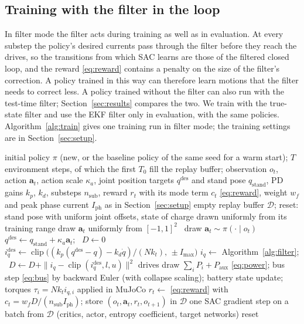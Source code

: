\subsection{Training with the filter in the loop}
In filter mode the filter acts during training as well as in evaluation. At every substep the policy's desired currents pass through the filter before they reach the drives, so the transitions from which SAC learns are those of the filtered closed loop, and the reward \eqref{eq:reward} contains a penalty on the size of the filter's correction. A policy trained in this way can therefore learn motions that the filter needs to correct less. A policy trained without the filter can also run with the test-time filter; Section~\ref{sec:results} compares the two. We train with the true-state filter and use the EKF filter only in evaluation, with the same policies. Algorithm~\ref{alg:train} gives one training run in filter mode; the training settings are in Section~\ref{sec:setup}.
\begin{algorithm}[tbp]
\caption{SAC training with the filter in the loop (filter mode)}\label{alg:train}
\begin{algorithmic}[1]
\Require initial policy $\pi$ (new, or the baseline policy of the same seed for a warm start); $T$ environment steps, of which the first $T_0$ fill the replay buffer; observation $o_t$, action $\mathbf a_t$, action scale $\kappa_a$, joint position targets $q^{\mathrm{des}}$ and stand pose $q_{\mathrm{stand}}$, PD gains $k_p$, $k_d$, substeps $n_{\mathrm{sub}}$, reward $r_t$ with its mode term $c_t$ \eqref{eq:reward}, weight $w_f$ and peak phase current $I_{\mathrm{ph}}$ as in Section~\ref{sec:setup}
\State empty replay buffer $\mathcal D$; reset: stand pose with uniform joint offsets, state of charge drawn uniformly from its training range
   draw $\mathbf a_t$ uniformly from $[-1,1]^2$ \Else\ draw $\mathbf a_t\sim\pi(\cdot\mid o_t)$ \EndIf
  \State $q^{\mathrm{des}}\gets q_{\mathrm{stand}}+\kappa_a\mathbf a_t$; \ $D\gets0$
    \State $i_q^{\mathrm{des}}\gets\operatorname{clip}\bigl((k_p(q^{\mathrm{des}}-q)-k_d\dot q)/(Nk_t),\,\pm I_{\max}\bigr)$ 
    \State $i_q\gets$ Algorithm~\ref{alg:filter}; \ $D\gets D+\|i_q-\operatorname{clip}(i_q^{\mathrm{des}},l,u)\|^2$
    \State drives draw $\sum_iP_i+P_{\mathrm{aux}}$ \eqref{eq:power}; bus step \eqref{eq:bus} by backward Euler (with collapse scaling); battery state update; torques $\tau_i=Nk_t i_{q,i}$ applied in MuJoCo
  \EndFor
  \State $r_t\gets$ \eqref{eq:reward} with $c_t=w_f D/(n_{\mathrm{sub}}I_{\mathrm{ph}})$; store $(o_t,\mathbf a_t,r_t,o_{t+1})$ in $\mathcal D$
   one SAC gradient step on a batch from $\mathcal D$ (critics, actor, entropy coefficient, target networks) \EndIf
   reset \EndIf
\EndFor
\end{algorithmic}
\end{algorithm}
